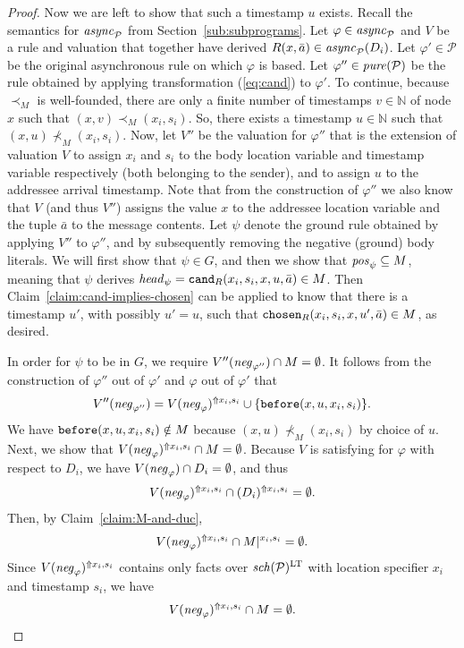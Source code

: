 \documentclass{tlp}
\newcommand{\Nat}{\mathbb{N}}  \newcommand{\len}[1]{|#1|} \newcommand{\rom}[1]{\text{\emph{(#1)}}} \newcommand{\romI}{\rom i}
\newcommand{\ded}{\mathcal{P}}
\newcommand{\rl}{\varphi}
\newcommand{\head}[1]{\fname{head}_{#1}}
\newcommand{\bpos}[1]{\fname{pos}_{#1}}
\newcommand{\bneg}[1]{\fname{neg}_{#1}}
\newcommand{\schof}[1]{\fname{sch}(#1)}
\newcommand{\grl}{\psi}
\newcommand{\toloct}[1]{#1^{\mathrm{LT}}}
\newcommand{\addlt}[3]{#1^{\Uparrow#2,#3}}
\newcommand{\projlt}[3]{#1|^{#2,#3}}
\newcommand{\before}{\pred{before}}
\newcommand{\chosen}{\pred{chosen}}
\newcommand{\cand}{\pred{cand}}
\newcommand{\pure}[1]{\fname{pure}(#1)}
\newcommand{\async}[1]{\fname{async}_{#1}}
\newcommand{\mstep}[1]{(#1)}
\newcommand{\grded}{G}
\newcommand{\cauM}{\prec_{M}}
\begin{document}
\begin{appendix}
\begin{proof}
Now we are left to show that such a timestamp $u$ exists. Recall
the semantics for $\async{\ded}$ from Section~\ref{sub:subprograms}.
Let $\rl\in\async{\ded}$ and $V$ be a rule and valuation that together
have derived $R(x,\bar{a})\in\async{\ded}\mstep{D_{i}}$. Let $\rl'\in\ded$
be the original asynchronous rule on which $\rl$ is based. Let $\rl''\in\pure{\ded}$
be the rule obtained by applying transformation (\ref{eq:cand}) to
$\rl'$. To continue, because $\cauM$ is well-founded, there are
only a finite number of timestamps $v\in\Nat$ of node $x$ such that
$(x,v)\cauM(x_{i},s_{i})$. So, there exists a timestamp $u\in\Nat$
such that $(x,u)\not\cauM(x_{i},s_{i})$. Now, let $V''$ be the
valuation for $\rl''$ that is the extension of valuation $V$ to
assign $x_{i}$ and $s_{i}$ to the body location variable and timestamp
variable respectively (both belonging to the sender), and to assign
$u$ to the addressee arrival timestamp. Note that from the construction
of $\rl''$ we also know that $V$ (and thus $V''$) assigns the value
$x$ to the addressee location variable and the tuple $\bar{a}$ to
the message contents. Let $\grl$ denote the ground rule obtained
by applying $V''$ to $\rl''$, and by subsequently removing the negative
(ground) body literals. We will first show that $\grl\in\grded$,
and then we show that $\bpos{\grl}\subseteq M$, meaning that $\grl$
derives $\head{\grl}=\cand_{R}(x_{i},s_{i},x,u,\bar{a})\in M$. Then
Claim~\ref{claim:cand-implies-chosen} can be applied to know that
there is a timestamp $u'$, with possibly $u'=u$, such that $\chosen_{R}(x_{i},s_{i},x,u',\bar{a})\in M$,
as desired.

In order for $\grl$ to be in $\grded$, we require $V''(\bneg{\rl''})\cap M=\emptyset$.
It follows from the construction of $\rl''$ out of $\rl'$ and $\rl$
out of $\rl'$ that 
\[
V''(\bneg{\rl''})=\addlt{V(\bneg{\rl})}{x_{i}}{s_{i}}\cup\{\before(x,u,x_{i},s_{i})\}.
\]
We have $\before(x,u,x_{i},s_{i})\notin M$ because $(x,u)\not\cauM(x_{i},s_{i})$
by choice of $u$.  Next, we show that $\addlt{V(\bneg{\rl})}{x_{i}}{s_{i}}\cap M=\emptyset$.
Because $V$ is satisfying for $\rl$ with respect to $D_{i}$, we
have $V(\bneg{\rl})\cap D_{i}=\emptyset$, and thus
\[
\addlt{V(\bneg{\rl})}{x_{i}}{s_{i}}\cap\addlt{(D_{i})}{x_{i}}{s_{i}}=\emptyset.
\]
Then, by Claim~\ref{claim:M-and-duc}, 
\[
\addlt{V(\bneg{\rl})}{x_{i}}{s_{i}}\cap\projlt M{x_{i}}{s_{i}}=\emptyset.
\]
Since $\addlt{V(\bneg{\rl})}{x_{i}}{s_{i}}$ contains only facts over
$\toloct{\schof{\ded}}$ with location specifier $x_{i}$ and timestamp
$s_{i}$, we have 
\[
\addlt{V(\bneg{\rl})}{x_{i}}{s_{i}}\cap M=\emptyset.
\]



\end{proof}
\end{appendix}
\end{document}
